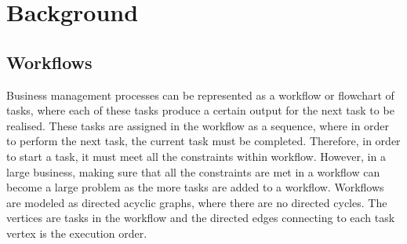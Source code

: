 \documentclass[a4paper]{report}
\begin{document}
\chapter{Background}
\section{Workflows}
\setlength{\parindent}{4em}
Business management processes can be represented as a workflow or flowchart of tasks, where each of these tasks produce a certain output for the next task to be realised. These tasks are assigned in the workflow as a sequence, where in order to perform the next task, the current task must be completed. Therefore, in order to start a task, it must meet all the constraints within workflow. However, in a large business, making sure that all the constraints are met in a workflow can become a large problem as the more tasks are added to a workflow. Workflows are modeled as directed acyclic graphs\cite{AcyclicDigraph}, where there are no directed cycles. The vertices are tasks in the workflow and the directed edges connecting to each task vertex is the execution order. \par
\end{document}
